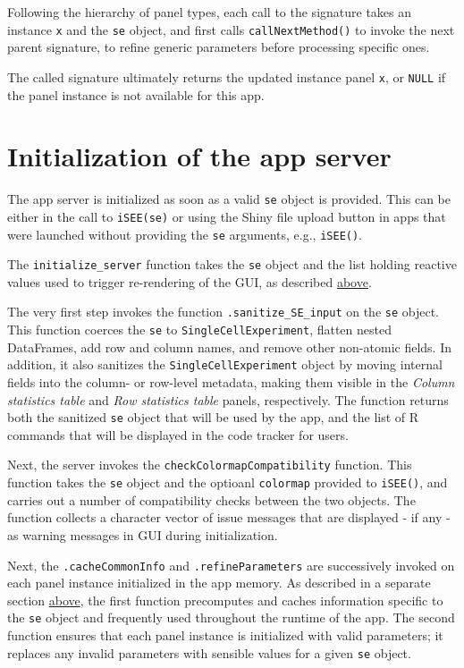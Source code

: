 \documentclass[]{book}
\begin{document}
Following the hierarchy of panel types, each call to the signature takes an instance \texttt{x} and the \texttt{se} object, and first calls \texttt{callNextMethod()} to invoke the next parent signature, to refine generic parameters before processing specific ones.

The called signature ultimately returns the updated instance panel \texttt{x}, or \texttt{NULL} if the panel instance is not available for this app.

\hypertarget{initialization-of-the-app-server}{%
\section{Initialization of the app server}\label{initialization-of-the-app-server}}

The app server is initialized as soon as a valid \texttt{se} object is provided.
This can be either in the call to \texttt{iSEE(se)} or using the Shiny file upload button in apps that were launched without providing the \texttt{se} arguments, e.g., \texttt{iSEE()}.

The \texttt{initialize\_server} function takes the \texttt{se} object and the list holding reactive values used to trigger re-rendering of the GUI, as described \protect\hyperlink{robjects}{above}.

The very first step invokes the function \texttt{.sanitize\_SE\_input} on the \texttt{se} object.
This function coerces the \texttt{se} to \texttt{SingleCellExperiment}, flatten nested DataFrames, add row and column names, and remove other non-atomic fields.
In addition, it also sanitizes the \texttt{SingleCellExperiment} object by moving internal fields into the column- or row-level metadata, making them visible in the \emph{Column statistics table} and \emph{Row statistics table} panels, respectively. The function returns both the sanitized \texttt{se} object that will be used by the app, and the list of R commands that will be displayed in the code tracker for users.

Next, the server invokes the \texttt{checkColormapCompatibility} function.
This function takes the \texttt{se} object and the optioanl \texttt{colormap} provided to \texttt{iSEE()}, and carries out a number of compatibility checks between the two objects.
The function collects a character vector of issue messages that are displayed - if any - as warning messages in GUI during initialization.

Next, the \texttt{.cacheCommonInfo} and \texttt{.refineParameters} are successively invoked on each panel instance initialized in the app memory.
As described in a separate section \protect\hyperlink{panel-api}{above}, the first function precomputes and caches information specific to the \texttt{se} object and frequently used throughout the runtime of the app.
The second function ensures that each panel instance is initialized with valid parameters; it replaces any invalid parameters with sensible values for a given \texttt{se} object.
\end{document}
